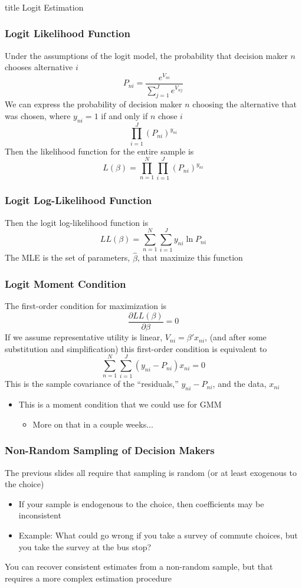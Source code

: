 \documentclass{beamer}\usepackage[]{graphicx}\usepackage[]{color}
\begin{document}
\begin{frame}\frametitle{}
    \vfill
    \centering
    \begin{beamercolorbox}[center]{title}
        \Large Logit Estimation
    \end{beamercolorbox}
    \vfill
\end{frame}

\begin{frame}\frametitle{Logit Likelihood Function}
    Under the assumptions of the logit model, the probability that decision maker $n$ chooses alternative $i$
    $$P_{ni} = \frac{e^{V_{ni}}}{\sum_{j = 1}^J e^{V_{nj}}}$$
    We can express the probability of decision maker $n$ choosing the alternative that was chosen, where $y_{ni} = 1$ if and only if $n$ chose $i$ 
    $$\prod_{i = 1}^J (P_{ni})^{y_{ni}}$$
    Then the likelihood function for the entire sample is
    $$L(\beta) = \prod_{n = 1}^N \prod_{i = 1}^J (P_{ni})^{y_{ni}}$$
\end{frame}

\begin{frame}\frametitle{Logit Log-Likelihood Function}
    Then the logit log-likelihood function is
    $$LL(\beta) = \sum_{n = 1}^N \sum_{i = 1}^J y_{ni} \ln P_{ni}$$
    The MLE is the set of parameters, $\hat{\beta}$, that maximize this function
\end{frame}

\begin{frame}\frametitle{Logit Moment Condition}
    The first-order condition for maximization is
    $$\frac{\partial LL(\beta)}{\partial \beta} = 0$$
    If we assume representative utility is linear, $V_{ni} = \beta' x_{ni}$, (and after some substitution and simplification) this first-order condition is equivalent to
    $$\sum_{n = 1}^N \sum_{i = 1}^J (y_{ni} - P_{ni}) x_{ni} = 0$$
    This is the sample covariance of the ``residuals,'' $y_{ni} - P_{ni}$, and the data, $x_{ni}$
    \begin{itemize}
    	\item This is a moment condition that we could use for GMM
    	\begin{itemize}
    		\item More on that in a couple weeks...
    	\end{itemize}
    \end{itemize}
\end{frame}

\begin{frame}\frametitle{Non-Random Sampling of Decision Makers}
    The previous slides all require that sampling is random (or at least exogenous to the choice)
    \begin{itemize}
    	\item If your sample is endogenous to the choice, then coefficients may be inconsistent
    	\item Example: What could go wrong if you take a survey of commute choices, but you take the survey at the bus stop?
    \end{itemize}
    \vspace{3ex}
    You can recover consistent estimates from a non-random sample, but that requires a more complex estimation procedure
\end{frame}
\end{document}
